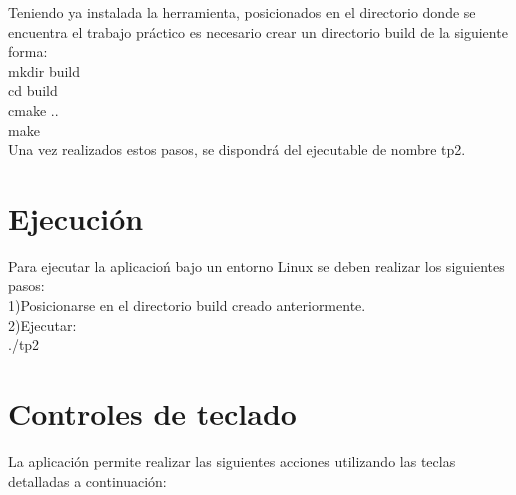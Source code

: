\documentclass[11pt]{article}
\begin{document}
Teniendo ya instalada la herramienta, posicionados en el directorio donde se encuentra el trabajo pr\'actico es necesario crear un directorio build
de la siguiente forma: \\
mkdir build \\
cd build \\
cmake .. \\
make \\

Una vez realizados estos pasos, se dispondr\'a del ejecutable de nombre tp2.

\section{Ejecuci\'on}

Para ejecutar la aplicacio\'n bajo un entorno Linux se deben realizar los siguientes pasos: \\
1)Posicionarse en el directorio build creado anteriormente. \\
2)Ejecutar: \\
./tp2 

\newpage
\section{Controles de teclado}

La aplicaci\'on permite realizar las siguientes acciones utilizando las teclas detalladas a continuaci\'on: \\
\end{document}
